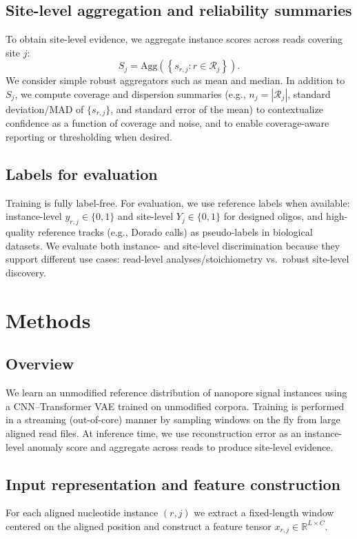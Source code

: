 \documentclass[sigconf, review]{acmart}
\begin{document}
\subsection{Site-level aggregation and reliability summaries}
To obtain site-level evidence, we aggregate instance scores across reads covering site $j$:
\begin{equation}
S_j = \mathrm{Agg}\left(\left\{ s_{r,j} : r \in \mathcal{R}_j \right\}\right).
\end{equation}
We consider simple robust aggregators such as mean and median. In addition to $S_j$, we compute
coverage and dispersion summaries (e.g., $n_j = |\mathcal{R}_j|$, standard deviation/MAD of
$\{s_{r,j}\}$, and standard error of the mean) to contextualize confidence as a function of coverage
and noise, and to enable coverage-aware reporting or thresholding when desired.

\subsection{Labels for evaluation}
Training is fully label-free. For evaluation, we use reference labels when available:
instance-level $y_{r,j}\in\{0,1\}$ and site-level $Y_j\in\{0,1\}$ for designed oligos, and
high-quality reference tracks (e.g., Dorado calls) as pseudo-labels in biological datasets.
We evaluate both instance- and site-level discrimination because they support different use cases:
read-level analyses/stoichiometry vs.\ robust site-level discovery.

\section{Methods}
\subsection{Overview}
We learn an unmodified reference distribution of nanopore signal instances using a CNN--Transformer
VAE trained on unmodified corpora. Training is performed in a streaming (out-of-core) manner by
sampling windows on the fly from large aligned read files. At inference time, we use reconstruction
error as an instance-level anomaly score and aggregate across reads to produce site-level evidence.

\subsection{Input representation and feature construction}
For each aligned nucleotide instance $(r,j)$ we extract a fixed-length window centered on the
aligned position and construct a feature tensor $x_{r,j}\in \mathbb{R}^{L\times C}$.
\end{document}
